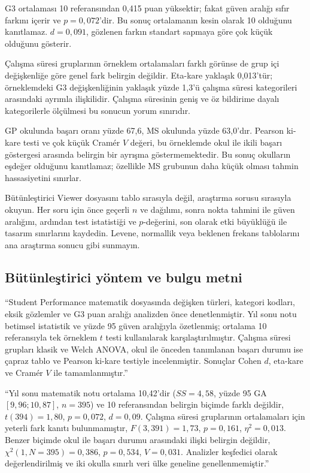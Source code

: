 G3 ortalaması 10 referansından 0,415 puan yüksektir; fakat güven aralığı sıfır
farkını içerir ve $p=0{,}072$'dir. Bu sonuç ortalamanın kesin olarak 10
olduğunu kanıtlamaz. $d=0{,}091$, gözlenen farkın standart sapmaya göre çok
küçük olduğunu gösterir.

Çalışma süresi gruplarının örneklem ortalamaları farklı görünse de grup içi
değişkenliğe göre genel fark belirgin değildir. Eta-kare yaklaşık 0,013'tür;
örneklemdeki G3 değişkenliğinin yaklaşık yüzde 1,3'ü çalışma süresi
kategorileri arasındaki ayrımla ilişkilidir. Çalışma süresinin geniş ve öz
bildirime dayalı kategorilerle ölçülmesi bu sonucun yorum sınırıdır.

GP okulunda başarı oranı yüzde 67,6, MS okulunda yüzde 63,0'dır. Pearson
ki-kare testi ve çok küçük Cramér $V$ değeri, bu örneklemde okul ile ikili
başarı göstergesi arasında belirgin bir ayrışma göstermemektedir. Bu sonuç
okulların eşdeğer olduğunu kanıtlamaz; özellikle MS grubunun daha küçük olması
tahmin hassasiyetini sınırlar.

\begin{outputguidebox}
Bütünleştirici Viewer dosyasını tablo sırasıyla değil, araştırma sorusu
sırasıyla okuyun. Her soru için önce geçerli $n$ ve dağılımı, sonra nokta
tahmini ile güven aralığını, ardından test istatistiği ve $p$-değerini, son
olarak etki büyüklüğü ile tasarım sınırlarını kaydedin. Levene, normallik veya
beklenen frekans tablolarını ana araştırma sonucu gibi sunmayın.
\end{outputguidebox}

\subsection{Bütünleştirici yöntem ve bulgu metni}

``Student Performance matematik dosyasında değişken türleri, kategori kodları,
eksik gözlemler ve G3 puan aralığı analizden önce denetlenmiştir. Yıl sonu notu
betimsel istatistik ve yüzde 95 güven aralığıyla özetlenmiş; ortalama 10
referansıyla tek örneklem $t$ testi kullanılarak karşılaştırılmıştır. Çalışma
süresi grupları klasik ve Welch ANOVA, okul ile önceden tanımlanan başarı
durumu ise çapraz tablo ve Pearson ki-kare testiyle incelenmiştir. Sonuçlar
Cohen $d$, eta-kare ve Cramér $V$ ile tamamlanmıştır.''

``Yıl sonu matematik notu ortalama 10,42'dir ($SS=4{,}58$, yüzde 95 GA
$[9{,}96;10{,}87]$, $n=395$) ve 10 referansından belirgin biçimde farklı
değildir, $t(394)=1{,}80$, $p=0{,}072$, $d=0{,}09$. Çalışma süresi
gruplarının ortalamaları için yeterli fark kanıtı bulunmamıştır,
$F(3,391)=1{,}73$, $p=0{,}161$, $\eta^2=0{,}013$. Benzer biçimde okul ile
başarı durumu arasındaki ilişki belirgin değildir,
$\chi^2(1,N=395)=0{,}386$, $p=0{,}534$, $V=0{,}031$. Analizler keşfedici
olarak değerlendirilmiş ve iki okulla sınırlı veri ülke geneline
genellenmemiştir.''

